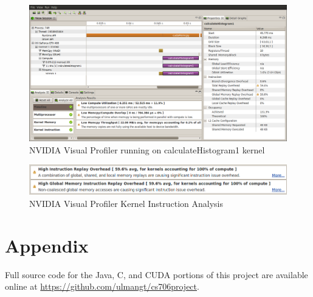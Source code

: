 \documentclass{article}
\begin{document}
\begin{figure}
\centering
\includegraphics[width=1.0\textwidth]{screenshots/nvvp/calculateHistogram1_screen1.png}
\caption{NVIDIA Visual Profiler running on calculateHistogram1 kernel}
\label{kernel1nvvp1}
\end{figure}

\begin{figure}
\centering
\includegraphics[width=1.0\textwidth]{screenshots/nvvp/calculateHistogram1_screen2.png}
\caption{NVIDIA Visual Profiler Kernel Instruction Analysis}
\label{kernel1nvvp2}
\end{figure}


\section{Appendix}\label{appendix}

Full source code for the Java, C, and CUDA portions of this project are available online at \url{https://github.com/ulmangt/cs706project}.



\end{document}
